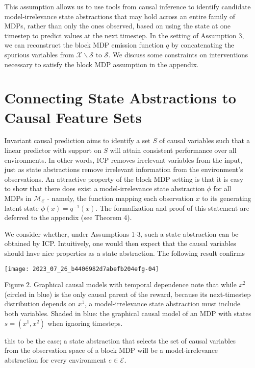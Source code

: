 \documentclass[10pt]{article}
\begin{document}
This assumption allows us to use tools from causal inference to identify candidate model-irrelevance state abstractions that may hold across an entire family of MDPs, rather than only the ones observed, based on using the state at one timestep to predict values at the next timestep. In the setting of Assumption 3, we can reconstruct the block MDP emission function $q$ by concatenating the spurious variables from $\mathcal{X} \backslash \mathcal{S}$ to $\mathcal{S}$. We discuss some constraints on interventions necessary to satisfy the block MDP assumption in the appendix.

\section{Connecting State Abstractions to Causal Feature Sets}
Invariant causal prediction aims to identify a set $S$ of causal variables such that a linear predictor with support on $S$ will attain consistent performance over all environments. In other words, ICP removes irrelevant variables from the input, just as state abstractions remove irrelevant information from the environment's observations. An attractive property of the block MDP setting is that it is easy to show that there does exist a model-irrelevance state abstraction $\phi$ for all MDPs in $\mathcal{M}_{\mathcal{E}}$ - namely, the function mapping each observation $x$ to its generating latent state $\phi(x)=q^{-1}(x)$. The formalization and proof of this statement are deferred to the appendix (see Theorem 4).

We consider whether, under Assumptions 1-3, such a state abstraction can be obtained by ICP. Intuitively, one would then expect that the causal variables should have nice properties as a state abstraction. The following result confirms

\begin{center}
\texttt{[image: 2023\_07\_26\_b4406982d7abefb204efg-04]}
\end{center}

Figure 2. Graphical causal models with temporal dependence note that while $x^{2}$ (circled in blue) is the only causal parent of the reward, because its next-timestep distribution depends on $x^{1}$, a model-irrelevance state abstraction must include both variables. Shaded in blue: the graphical causal model of an MDP with states $s=\left(x^{1}, x^{2}\right)$ when ignoring timesteps.

this to be the case; a state abstraction that selects the set of causal variables from the observation space of a block MDP will be a model-irrelevance abstraction for every environment $e \in \mathcal{E}$.
\end{document}

